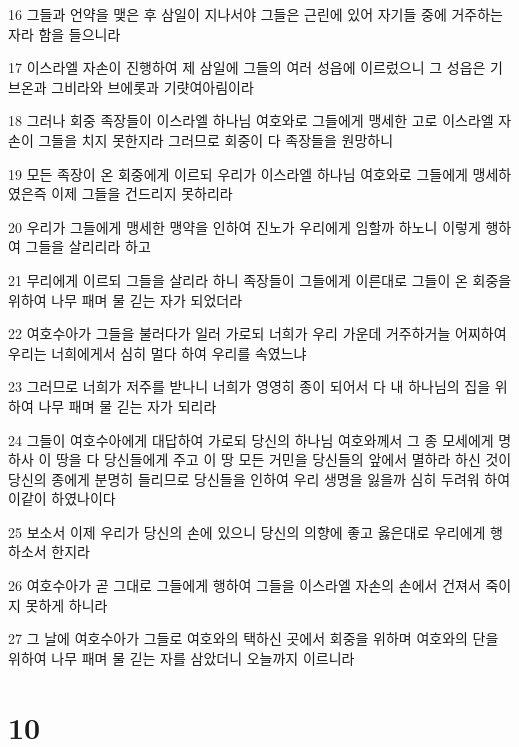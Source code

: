 \par 16 그들과 언약을 맺은 후 삼일이 지나서야 그들은 근린에 있어 자기들 중에 거주하는 자라 함을 들으니라
\par 17 이스라엘 자손이 진행하여 제 삼일에 그들의 여러 성읍에 이르렀으니 그 성읍은 기브온과 그비라와 브에롯과 기럇여아림이라
\par 18 그러나 회중 족장들이 이스라엘 하나님 여호와로 그들에게 맹세한 고로 이스라엘 자손이 그들을 치지 못한지라 그러므로 회중이 다 족장들을 원망하니
\par 19 모든 족장이 온 회중에게 이르되 우리가 이스라엘 하나님 여호와로 그들에게 맹세하였은즉 이제 그들을 건드리지 못하리라
\par 20 우리가 그들에게 맹세한 맹약을 인하여 진노가 우리에게 임할까 하노니 이렇게 행하여 그들을 살리리라 하고
\par 21 무리에게 이르되 그들을 살리라 하니 족장들이 그들에게 이른대로 그들이 온 회중을 위하여 나무 패며 물 긷는 자가 되었더라
\par 22 여호수아가 그들을 불러다가 일러 가로되 너희가 우리 가운데 거주하거늘 어찌하여 우리는 너희에게서 심히 멀다 하여 우리를 속였느냐
\par 23 그러므로 너희가 저주를 받나니 너희가 영영히 종이 되어서 다 내 하나님의 집을 위하여 나무 패며 물 긷는 자가 되리라
\par 24 그들이 여호수아에게 대답하여 가로되 당신의 하나님 여호와께서 그 종 모세에게 명하사 이 땅을 다 당신들에게 주고 이 땅 모든 거민을 당신들의 앞에서 멸하라 하신 것이 당신의 종에게 분명히 들리므로 당신들을 인하여 우리 생명을 잃을까 심히 두려워 하여 이같이 하였나이다
\par 25 보소서 이제 우리가 당신의 손에 있으니 당신의 의향에 좋고 옳은대로 우리에게 행하소서 한지라
\par 26 여호수아가 곧 그대로 그들에게 행하여 그들을 이스라엘 자손의 손에서 건져서 죽이지 못하게 하니라
\par 27 그 날에 여호수아가 그들로 여호와의 택하신 곳에서 회중을 위하며 여호와의 단을 위하여 나무 패며 물 긷는 자를 삼았더니 오늘까지 이르니라

\chapter{10}

